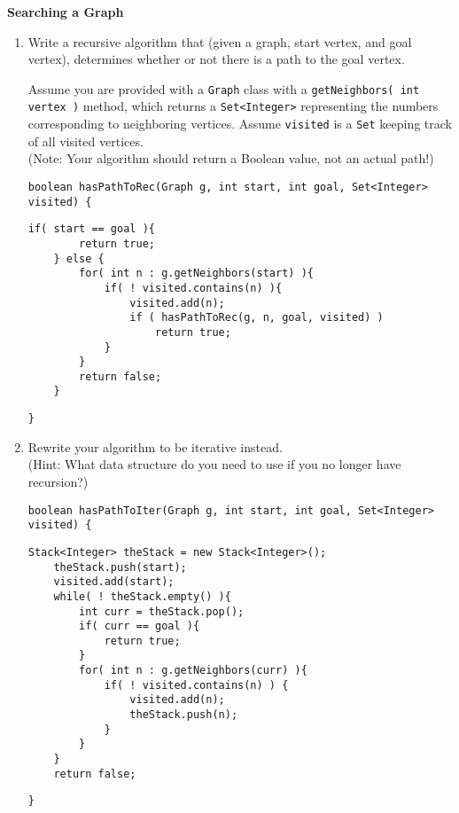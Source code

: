 \textbf{Searching a Graph}
	\begin{enumerate}
		\item
			Write a recursive algorithm that (given a graph, start vertex, and goal vertex),
			determines whether or not there is a path to the goal vertex.

            Assume you are provided with a \texttt{Graph} class with a \texttt{getNeighbors( int vertex )} method, which returns a \texttt{Set\textless Integer\textgreater} representing the numbers corresponding to neighboring vertices. Assume \texttt{visited} is a \texttt{Set} keeping track of all visited vertices. \\
			(Note: Your algorithm should return a Boolean value, not an actual path!)
\begin{verbatim}
boolean hasPathToRec(Graph g, int start, int goal, Set<Integer> visited) {
\end{verbatim}
			
\begin{answer}
\begin{lstlisting}[numbers=none]
	if( start == goal ){
		return true;
	} else {
		for( int n : g.getNeighbors(start) ){
			if( ! visited.contains(n) ){
				visited.add(n);
				if ( hasPathToRec(g, n, goal, visited) )
					return true;
			}
		}
		return false;
	}
\end{lstlisting}
\end{answer}

\begin{verbatim}
}
\end{verbatim}
		            
		\item
			Rewrite your algorithm to be iterative instead. \\
			(Hint: What data structure do you need to use if you no longer have recursion?)
\begin{verbatim}
boolean hasPathToIter(Graph g, int start, int goal, Set<Integer> visited) {
\end{verbatim}	
			
\begin{answer}
\begin{lstlisting}[numbers=none]
	Stack<Integer> theStack = new Stack<Integer>();
	theStack.push(start);
	visited.add(start);
	while( ! theStack.empty() ){
		int curr = theStack.pop();
		if( curr == goal ){
			return true;
		}
		for( int n : g.getNeighbors(curr) ){
			if( ! visited.contains(n) ) {
				visited.add(n);
				theStack.push(n);
			}
		}
	}
	return false;
\end{lstlisting}
\end{answer}

\begin{verbatim}
}
\end{verbatim}
	\end{enumerate}
